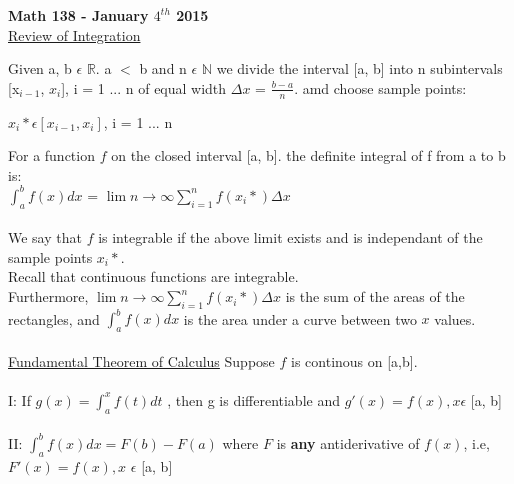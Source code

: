 \documentclass[12pt]{letter}
\begin{document}
\begin{center}{{\LARGE \textbf{Math 138 - January $4^{th}$ 2015}} \\  \underline{Review of Integration}}\end{center}

Given a, b {\Large $\epsilon$} $\mathbb{R}$. a $<$ b and n {\Large $\epsilon$} $\mathbb{N}$ we divide the interval [a, b] into n subintervals [x$_{i-1}$, $x_{i}$],
i = 1 ... n of equal width $\Delta x$ = $\frac{b - a}{n}$. amd choose sample points:  \\
\begin{center}$x_{i} * \epsilon [x_{i-1}, x_{i}]$, i = 1 ... n\end{center} 
For a function $f$ on the closed interval [a, b]. the definite integral of  f from a to b is: \\
{\large{$\int_{a}^{b} f(x) dx$ = $\lim{n\to\infty} \sum_{i=1}^n f(x_{i} *) \Delta x$}} \\ \\
We say that $f$ is integrable if the above limit exists and is independant of the sample points $x_{i} *$. \\
Recall that continuous functions are integrable. \\
 Furthermore, $\lim{n\to\infty} \sum_{i=1}^n f(x_{i} *) \Delta x$ is the sum of the areas of the rectangles, and $\int_{a}^{b} f(x) dx$ is the area under a curve between two $x$ values. \\ \\
\underline {Fundamental Theorem of Calculus}
Suppose $f$ is continous on [a,b]. \\ \\
I: If $g(x) =  \int_{a}^{x} f(t) dt$ , then g is differentiable and $g'(x) = f(x), x${\Large $\epsilon$} [a, b] \\ \\
II: $\int_{a}^{b} f(x)dx = F(b) - F(a)$ where $F$ is \textbf{any} antiderivative of $f(x)$, i.e, $F'(x) = f(x), x$ {\large {$\epsilon$}} [a, b]
\end{document}
